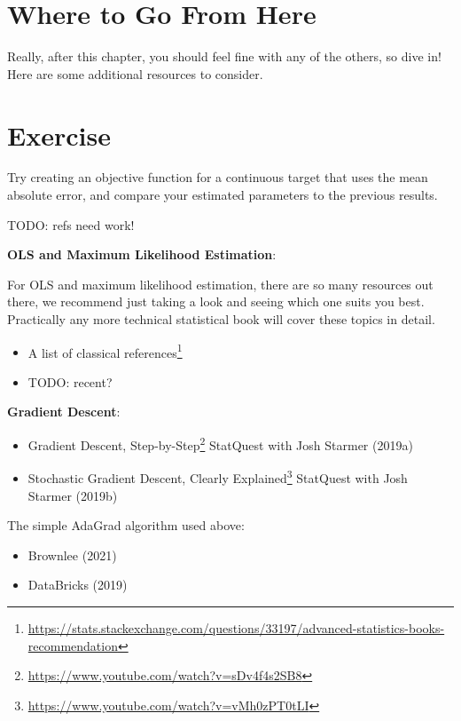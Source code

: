 \documentclass[
  letterpaper,
]{krantz}
\providecommand{\tightlist}{%
  \setlength{\itemsep}{0pt}\setlength{\parskip}{0pt}}\usepackage{longtable,booktabs,array}
\DeclareRobustCommand{\href}[2]{#2\footnote{\url{#1}}}
\begin{document}
\section{Where to Go From Here}\label{sec-estim-where-to-go}

Really, after this chapter, you should feel fine with any of the others,
so dive in! Here are some additional resources to consider.

\section{Exercise}\label{exercise-1}

Try creating an objective function for a continuous target that uses the
mean absolute error, and compare your estimated parameters to the
previous results.

TODO: refs need work!

\textbf{OLS and Maximum Likelihood Estimation}:

For OLS and maximum likelihood estimation, there are so many resources
out there, we recommend just taking a look and seeing which one suits
you best. Practically any more technical statistical book will cover
these topics in detail.

\begin{itemize}
\tightlist
\item
  \href{https://stats.stackexchange.com/questions/33197/advanced-statistics-books-recommendation}{A
  list of classical references}
\item
  TODO: recent?
\end{itemize}

\textbf{Gradient Descent}:

\begin{itemize}
\tightlist
\item
  \href{https://www.youtube.com/watch?v=sDv4f4s2SB8}{Gradient Descent,
  Step-by-Step} StatQuest with Josh Starmer (2019a)
\item
  \href{https://www.youtube.com/watch?v=vMh0zPT0tLI}{Stochastic Gradient
  Descent, Clearly Explained} StatQuest with Josh Starmer (2019b)
\end{itemize}

The simple AdaGrad algorithm used above:

\begin{itemize}
\tightlist
\item
  Brownlee (2021)
\item
  DataBricks (2019)
\end{itemize}
\end{document}
